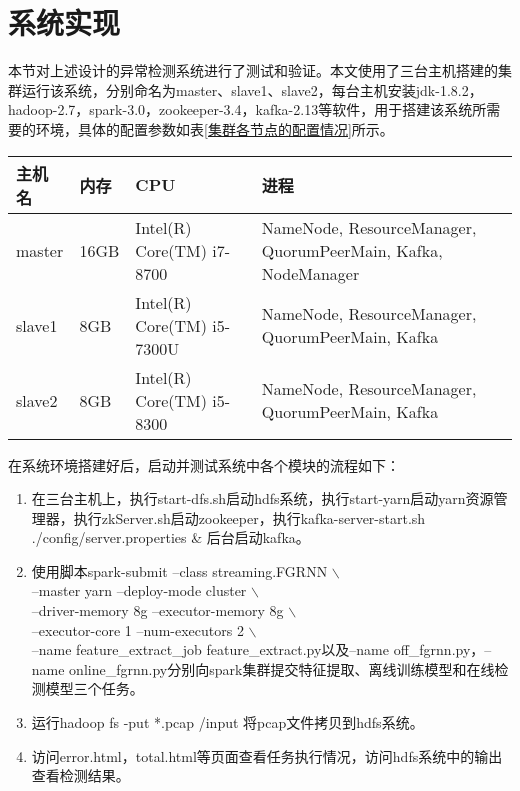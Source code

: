 \section{系统实现}
本节对上述设计的异常检测系统进行了测试和验证。本文使用了三台主机搭建的集群运行该系统，分别命名为master、slave1、slave2，每台主机安装jdk-1.8.2，hadoop-2.7，spark-3.0，zookeeper-3.4，kafka-2.13等软件，用于搭建该系统所需要的环境，具体的配置参数如表\ref{集群各节点的配置情况}所示。
\begin{table*}[h]
  \small
  \caption{集群各节点的配置情况}
  \label{集群各节点的配置情况}
  \centering
  \begin{tabular}{p{}<{\centering} p{}<{\centering} p{}<{\centering} p{}<{\centering}}
  \toprule
  主机名 & 内存 & CPU &  进程 \\
  
  \midrule
 master & 16GB & Intel(R) Core(TM) i7-8700 & NameNode, ResourceManager, QuorumPeerMain, Kafka, NodeManager \\
 \midrule
 slave1 & 8GB & Intel(R) Core(TM) i5-7300U & NameNode, ResourceManager, QuorumPeerMain, Kafka \\
 \midrule
 slave2 & 8GB & Intel(R) Core(TM) i5-8300 & NameNode, ResourceManager, QuorumPeerMain, Kafka \\
 
   \bottomrule
  
  \end{tabular}
  \end{table*}

在系统环境搭建好后，启动并测试系统中各个模块的流程如下：
\begin{enumerate}
  \item 在三台主机上，执行start-dfs.sh启动hdfs系统，执行start-yarn启动yarn资源管理器，执行zkServer.sh启动zookeeper，执行kafka-server-start.sh ./config/server.properties \& 后台启动kafka。
  \item 使用脚本spark-submit --class streaming.FGRNN $\backslash$ \\
  --master yarn --deploy-mode cluster $\backslash$ \\
  --driver-memory 8g --executor-memory 8g $\backslash$ \\
  --executor-core 1 --num-executors 2 $\backslash$ \\
 --name feature\_extract\_job feature\_extract.py以及--name off\_fgrnn.py，--name online\_fgrnn.py分别向spark集群提交特征提取、离线训练模型和在线检测模型三个任务。
 \item 运行hadoop fs -put *.pcap /input 将pcap文件拷贝到hdfs系统。
 \item 访问error.html，total.html等页面查看任务执行情况，访问hdfs系统中的输出查看检测结果。
\end{enumerate}

